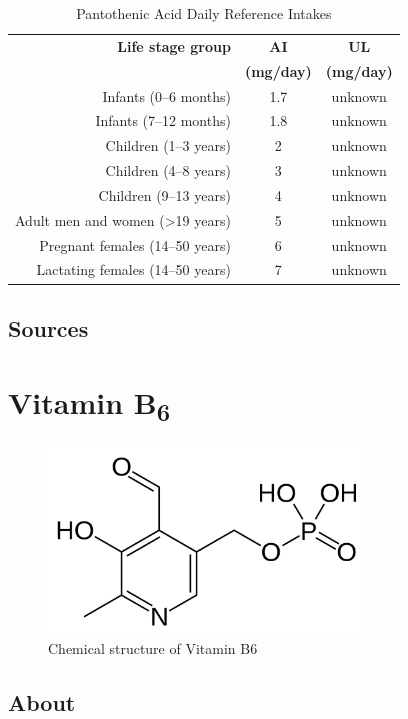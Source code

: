 \documentclass{book}
\begin{document}
\begin{table}[h]
	\caption{Pantothenic Acid Daily Reference Intakes}
	\centering \begin{tabular}{| r | c | c |}
		\hline
		\textbf{Life stage group} & \textbf{AI} & \textbf{UL}\\
		& \textbf{(mg/day)} & \textbf{(mg/day)}\\ \hline
		Infants (0--6 months) & 1.7 & unknown\\ \hline
		Infants (7--12 months) & 1.8 & unknown\\ \hline
		Children (1--3 years) & 2 & unknown\\ \hline
		Children (4--8 years) & 3 & unknown\\ \hline
		Children (9--13 years) & 4 & unknown\\ \hline
		Adult men and women (\textgreater19 years) & 5 & unknown\\ \hline
		Pregnant females (14--50 years) & 6 & unknown\\ \hline
		Lactating females (14--50 years) & 7 & unknown\\ \hline
	\end{tabular}
\end{table}
\newpage

\section{Sources}


\chapter{Vitamin B\textsubscript{6}}
\begin{figure}[h]
	\caption{Chemical structure of Vitamin B6}
	\centering \includegraphics[width=0.75\textwidth]{images/Vitamin_B6_chemical_structure}
\end{figure}
\newpage

\section{About}
\end{document}
